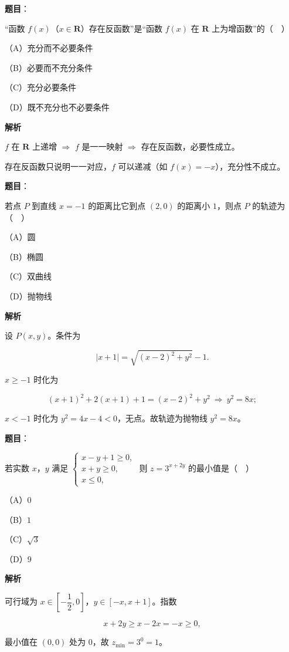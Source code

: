 \begin{answer}

\textbf{题目}：

“函数 $f(x)$（$x\in\mathbf R$）存在反函数”是“函数 $f(x)$ 在 $\mathbf R$ 上为增函数”的（　）

（A）充分而不必要条件

（B）必要而不充分条件

（C）充分必要条件

（D）既不充分也不必要条件

\textbf{解析}

$f$ 在 $\mathbf R$ 上递增 $\Rightarrow$ $f$ 是一一映射 $\Rightarrow$ 存在反函数，必要性成立。

存在反函数只说明一一对应，$f$ 可以递减（如 $f(x)=-x$），充分性不成立。


\end{answer}
\begin{answer}

\textbf{题目}：

若点 $P$ 到直线 $x=-1$ 的距离比它到点 $(2,0)$ 的距离小 $1$，则点 $P$ 的轨迹为（　）

（A）圆

（B）椭圆

（C）双曲线

（D）抛物线

\textbf{解析}

设 $P(x,y)$。条件为

\nopagebreak[4]
\[|x+1|=\sqrt{(x-2)^2+y^2}-1.\]

$x\geqslant-1$ 时化为

\nopagebreak[4]
\[(x+1)^2+2(x+1)+1=(x-2)^2+y^2\ \Longrightarrow\ y^2=8x;\]

$x<-1$ 时化为 $y^2=4x-4<0$，无点。故轨迹为抛物线 $y^2=8x$。


\end{answer}
\begin{answer}

\textbf{题目}：

若实数 $x$，$y$ 满足 $\begin{cases}x-y+1\geqslant0,\\ x+y\geqslant0,\\ x\leqslant0,\end{cases}$ 则 $z=3^{x+2y}$ 的最小值是（　）

（A）$0$

（B）$1$

（C）$\sqrt3$

（D）$9$

\textbf{解析}

可行域为 $x\in\left[-\dfrac12,0\right]$，$y\in[-x,x+1]$。指数

\nopagebreak[4]
\[x+2y\geqslant x-2x=-x\geqslant0,\]

最小值在 $(0,0)$ 处为 $0$，故 $z_{\min}=3^0=1$。


\end{answer}
